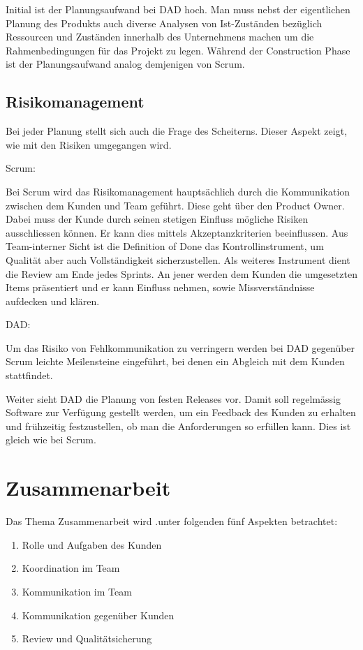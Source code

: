 Initial ist der Planungsaufwand bei DAD hoch. Man muss nebst der eigentlichen Planung des Produkts auch diverse Analysen von Ist-Zuständen bezüglich Ressourcen und Zuständen innerhalb des Unternehmens machen um die Rahmenbedingungen für das Projekt zu legen. Während der Construction Phase ist der Planungsaufwand analog demjenigen von Scrum.


\subsection{Risikomanagement}

Bei jeder Planung stellt sich auch die Frage des Scheiterns. Dieser Aspekt zeigt, wie mit den Risiken umgegangen wird.

{\Large Scrum:} \medskip

Bei Scrum wird das Risikomanagement hauptsächlich durch die Kommunikation zwischen dem Kunden und Team geführt. Diese geht über den Product Owner. Dabei muss der Kunde durch seinen stetigen Einfluss mögliche Risiken ausschliessen können. Er kann dies mittels Akzeptanzkriterien beeinflussen.\newline
Aus Team-interner Sicht ist die Definition of Done das Kontrollinstrument, um Qualität aber auch Vollständigkeit sicherzustellen.
Als weiteres Instrument dient die Review am Ende jedes Sprints. An jener werden dem Kunden die umgesetzten Items präsentiert und er kann Einfluss nehmen, sowie Missverständnisse aufdecken und klären.

\bigskip 

{\Large DAD:} \medskip

Um das Risiko von Fehlkommunikation zu verringern werden bei DAD gegenüber Scrum leichte Meilensteine eingeführt, bei denen ein Abgleich mit dem Kunden stattfindet. \medskip

Weiter sieht DAD die Planung von festen Releases vor. Damit soll regelmässig Software zur Verfügung gestellt werden, um ein Feedback des Kunden zu erhalten und frühzeitig festzustellen, ob man die Anforderungen so erfüllen kann. Dies ist gleich wie bei Scrum.

\section{Zusammenarbeit}

Das Thema Zusammenarbeit wird .unter folgenden fünf Aspekten betrachtet:
\begin{enumerate}
\item Rolle und Aufgaben des Kunden
\item Koordination im Team
\item Kommunikation im Team
\item Kommunikation gegenüber Kunden
\item Review und Qualitätsicherung
\end{enumerate}

